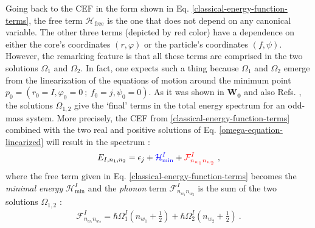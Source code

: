 Going back to the CEF in the form shown in Eq. \ref{classical-energy-function-terms}, the free term $\mathcal{H}_\text{free}$ is the one that does not depend on any canonical variable. The other three terms (depicted by red color) have a dependence on either the core's coordinates $(r,\varphi)$ or the particle's coordinates $(f,\psi)$. However, the remarking feature is that all these terms are comprised in the two solutions $\Omega_1$ and $\Omega_2$. In fact, one expects such a thing because $\Omega_1$ and $\Omega_2$ emerge from the linearization of the equations of motion around the minimum point $p_0=(r_0=I,\varphi_0=0\ ;\ f_0=j,\psi_0=0)$. As it was shown in $\mathbf{W_0}$ and also Refs. \cite{raduta2020approach,raduta2020new}, the solutions $\Omega_{1,2}$ give the `final' terms in the total energy spectrum for an odd-mass system. More precisely, the CEF from \ref{classical-energy-function-terms} combined with the two real and positive solutions of Eq. \ref{omega-equation-linearized} will result in the spectrum \cite{poenaru2021extensive1}:
\begin{align}
    E_{I,n_1,n_2}=\epsilon_j+{\color{blue}\mathcal{H}_\text{min}^I}+{\color{red}\mathcal{F}^I_{n_{w_1}n_{w_2}}}\ ,
    \label{tsd-bands-compressed-spectrum}
\end{align}
where the free term given in Eq. \ref{classical-energy-function-terms} becomes the \emph{minimal energy} $\mathcal{H}_\text{min}^I$ and the \emph{phonon} term $\mathcal{F}_{n_{w_1}n_{w_2}}^I$ is the sum of the two solutions $\Omega_{1,2}$ \cite{poenaru2021extensive1}:
\begin{align}
    \mathcal{F}_{n_{w_1}n_{w_2}}^I=\hbar\Omega_1^I\left(n_{w_1}+\frac{1}{2}\right)+\hbar\Omega_2^I\left(n_{w_2}+\frac{1}{2}\right)\ .
    \label{phononic-term-tsd-energies}
\end{align}

